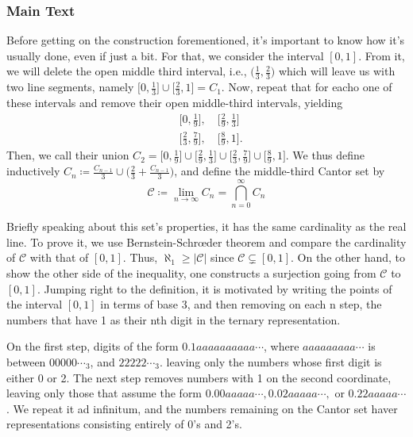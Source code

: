 \documentclass[a4paper]{article}
\theoremstyle{plain}
\theoremstyle{definition}
\begin{document}
 \subsubsection{Main Text} 
   Before getting on the construction forementioned, it's important to know how it's usually done, even if just a bit.  
 For that, we consider the interval $[0, 1].$ From it, we will delete the open middle third interval, i.e., $\biggl(\frac{1}{3}, \frac{2}{3}\biggr)$ 
 which will leave us with two line segments, namely $\biggl[0, \frac{1}{3}\biggr]\cup\biggl[\frac{2}{3}, 1\biggr] = C_{1}.$ Now, 
 repeat that for eacho one of these intervals and remove their open middle-third intervals, yielding  
 \begin{align*} 
   &\biggl[0, \frac{1}{9}\biggr],\quad\biggl[\frac{2}{9}, \frac{1}{3}\biggr]\\ 
   &\biggl[\frac{2}{3}, \frac{7}{9}\biggr],\quad \biggl[\frac{8}{9}, 1\biggr]. 
 \end{align*} 
   Then, we call their union $C_{2} = \biggl[0, \frac{1}{9}\biggr]\cup\biggl[\frac{2}{9}, \frac{1}{3}\biggr]\cup\biggl[\frac{2}{3}, \frac{7}{9}\biggr]\cup\biggl[\frac{8}{9}, 1\biggr].$ 
 We thus define inductively $C_{n}\coloneqq\displaystyle \frac{C_{n-1}}{3}\cup\biggl(\frac{2}{3}+\frac{C_{n-1}}{3}\biggr)$, and  
 define the middle-third Cantor set by  
   $$ 
   \boxed{\mathcal{C}\coloneqq \lim_{n\to\infty}C_{n} = \bigcap_{n=0}^{\infty}C_{n}} 
   $$ 
  
   Briefly speaking about this set's properties, it has the same cardinality as the real line. To prove it, we use Bernstein-Schr\oe der 
 theorem and compare the cardinality of $\mathcal{C}$ with that of $[0, 1].$ Thus, $\aleph_{1}\geq{|\mathcal{C}|}$ since $\mathcal{C}\subsetneq{[0, 1]}$. 
 On the other hand, to show the other side of the inequality, one constructs a surjection going from $\mathcal{C}$ to $[0, 1]$. 
 Jumping right to the definition, it is motivated by writing the points of the interval $[0, 1]$ in terms of base 3, and then removing 
 on each n step, the numbers that have 1 as their nth digit in the ternary representation. 
  
   On the first step, digits of the form $0.1aaaaaaaaaa\cdots$, where $aaaaaaaaa \cdots$ is between $00000\cdots_{3}$, and $22222 \cdots_{3}.$ 
 leaving only the numbers whose first digit is either 0 or 2. The next step removes numbers with 1 on the second coordinate, leaving only those 
 that assume the form $0.00aaaaa \cdots,0.02aaaaa \cdots, \text{ or } 0.22aaaaa\cdots$. We repeat it ad infinitum, and the numbers 
 remaining on the Cantor set haver representations consisting entirely of 0's and 2's. 
  
\end{document}
